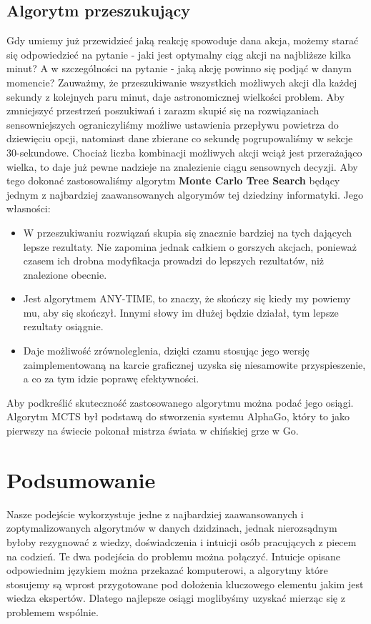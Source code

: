 \documentclass[a4paper]{article}
\begin{document}
\subsection{Algorytm przeszukujący}
Gdy umiemy już przewidzieć jaką reakcję spowoduje dana akcja, możemy starać się odpowiedzieć na pytanie - jaki jest optymalny ciąg akcji na najbliższe kilka minut? A w szczególności na pytanie - jaką akcję powinno się podjąć w danym momencie? Zauważmy, że przeszukiwanie wszystkich możliwych akcji dla każdej sekundy z kolejnych paru minut, daje astronomicznej wielkości problem. Aby zmniejszyć przestrzeń poszukiwań i zarazm skupić się na rozwiązaniach sensowniejszych ograniczyliśmy możliwe ustawienia przepływu powietrza do dziewięciu opcji, natomiast dane zbierane co sekundę pogrupowaliśmy w sekcje 30-sekundowe. Chociaż liczba kombinacji możliwych akcji wciąż jest przerażająco wielka, to daje już pewne nadzieje na znalezienie ciągu sensownych decyzji. Aby tego dokonać zastosowaliśmy algorytm \textbf{Monte Carlo Tree Search} będący jednym z najbardziej zaawansowanych algorymów tej dziedziny informatyki. Jego własności:
\begin{itemize}
\item W przeszukiwaniu rozwiązań skupia się znacznie bardziej na tych dających lepsze rezultaty. Nie zapomina jednak całkiem o gorszych akcjach, ponieważ czasem ich drobna modyfikacja prowadzi do lepszych rezultatów, niż znalezione obecnie.
\item Jest algorytmem ANY-TIME, to znaczy, że skończy się kiedy my powiemy mu, aby się skończył. Innymi słowy im dłużej będzie działał, tym lepsze rezultaty osiągnie.
\item Daje możliwość zrównoleglenia, dzięki czamu stosując jego wersję zaimplementowaną na karcie graficznej uzyska się niesamowite przyspieszenie, a co za tym idzie poprawę efektywności.
\end{itemize}
Aby podkreślić skuteczność zastosowanego algorytmu można podać jego osiągi. Algorytm MCTS był podstawą do stworzenia systemu AlphaGo, który to jako pierwszy na świecie pokonał mistrza świata w chińskiej grze w Go.

\section{Podsumowanie}
Nasze podejście wykorzystuje jedne z najbardziej zaawansowanych i zoptymalizowanych algorytmów w danych dzidzinach, jednak nierozsądnym byłoby rezygnować z wiedzy, doświadczenia i intuicji osób pracujących z piecem na codzień. Te dwa podejścia do problemu można połączyć. Intuicje opisane odpowiednim językiem można przekazać komputerowi, a algorytmy które stosujemy są wprost przygotowane pod dołożenia kluczowego elementu jakim jest wiedza ekspertów. Dlatego najlepsze osiągi moglibyśmy uzyskać mierząc się z problemem wspólnie.

\end{document}
